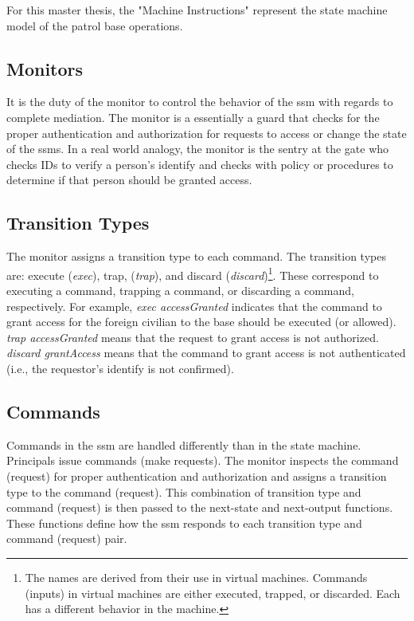 \documentclass[../../main/main.tex]{subfiles}
\begin{document}
For this master thesis, the "Machine Instructions" represent the state machine model of the patrol base operations.


 
\subsection{Monitors}\label{monitors}
It is the duty of the monitor to control the behavior of the \gls{ssm} with regards to complete mediation.  The monitor is a essentially a guard that checks for the proper authentication and authorization for requests to access or change the state of the \glspl{ssm}.  In a real world analogy, the monitor is the sentry at the gate who checks IDs to verify a person's identify and checks with policy or procedures to determine if that person should be granted access.  

\subsection{Transition Types}
The monitor assigns a transition type to each command.  The transition types are: execute (\textit{exec}), trap, (\textit{trap}), and discard (\textit{discard})\footnote{The names are derived from their use in virtual machines.  Commands (inputs) in virtual machines are either executed, trapped, or discarded.  Each has a different behavior in the machine.}.  These correspond to executing a command, trapping a command, or discarding a command, respectively.  For example, \textit{exec accessGranted} indicates that the command to grant access for the foreign civilian to the base should be executed (or allowed).  \textit{trap accessGranted} means that the request to grant access is not authorized.  \textit{discard grantAccess} means that the command to grant access is not authenticated (i.e., the requestor's identify is not confirmed).

\subsection{Commands}
Commands in the \gls{ssm} are handled differently than in the state machine.  Principals issue commands (make requests).  The monitor inspects the command (request) for proper authentication and authorization and assigns a transition type to the command (request).  This combination of transition type and command (request) is then passed to the next-state and next-output functions.  These functions define how the \gls{ssm} responds to each transition type and command (request) pair.  
\end{document}
